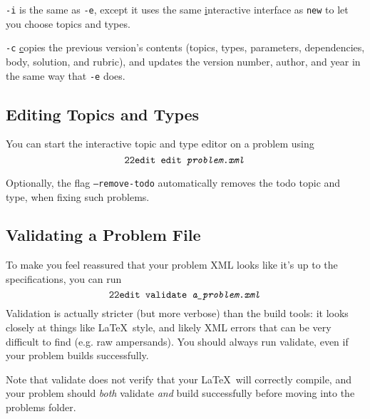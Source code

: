     \texttt{-i} is the same as \texttt{-e}, except it uses the same 
    \underline{i}nteractive interface as \pytool\texttt{new} to let you 
    choose topics and types.
    
    \texttt{-c} \underline{c}opies the previous version's contents 
    (topics, types, parameters, dependencies, body, solution, and rubric),
    and updates the version number, author, and year in the same way that 
    \texttt{-e} does.
    
  \subsection{Editing Topics and Types}
    You can start the interactive topic and type editor on a problem using 
    \[\texttt{22edit }\texttt{edit \textit{problem.xml}}\]
    
    Optionally, the flag \texttt{--remove-todo} automatically removes the 
    todo topic and type, when fixing such problems.
    
  \subsection{Validating a Problem File}
    To make you feel reassured that your problem XML looks like it's up to 
    the specifications, you can run 
    \[\texttt{22edit }\texttt{validate \textit{a\_problem.xml}}\] 
    Validation is actually stricter (but more verbose) than the build 
    tools: it looks closely at things like \LaTeX\ style, and likely XML 
    errors that can be very difficult to find (e.g. raw ampersands). 
    You should always run validate, even if your problem builds successfully.
    
    Note that validate does not verify that your \LaTeX\ will correctly compile,
    and your problem should \textit{both} validate \textit{and} build
    successfully before moving into the problems folder.
    